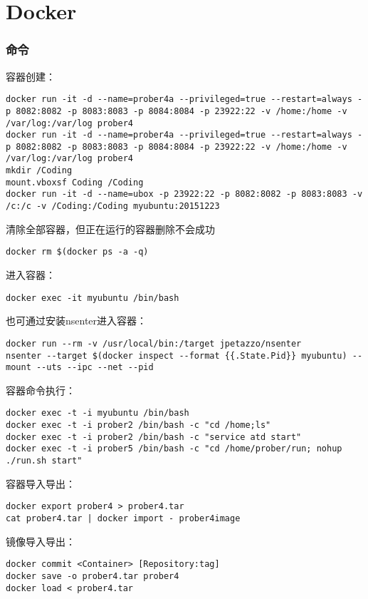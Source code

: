 \section{Docker}

\subsubsection{命令}


容器创建：
\begin{verbatim}
docker run -it -d --name=prober4a --privileged=true --restart=always -p 8082:8082 -p 8083:8083 -p 8084:8084 -p 23922:22 -v /home:/home -v /var/log:/var/log prober4 
docker run -it -d --name=prober4a --privileged=true --restart=always -p 8082:8082 -p 8083:8083 -p 8084:8084 -p 23922:22 -v /home:/home -v /var/log:/var/log prober4 
mkdir /Coding
mount.vboxsf Coding /Coding
docker run -it -d --name=ubox -p 23922:22 -p 8082:8082 -p 8083:8083 -v /c:/c -v /Coding:/Coding myubuntu:20151223
\end{verbatim}

清除全部容器，但正在运行的容器删除不会成功
\begin{verbatim}
docker rm $(docker ps -a -q) 
\end{verbatim}



进入容器：
\begin{verbatim}
docker exec -it myubuntu /bin/bash
\end{verbatim}

也可通过安装nsenter进入容器：
\begin{verbatim}
docker run --rm -v /usr/local/bin:/target jpetazzo/nsenter
nsenter --target $(docker inspect --format {{.State.Pid}} myubuntu) --mount --uts --ipc --net --pid
\end{verbatim}

容器命令执行：
\begin{verbatim}
docker exec -t -i myubuntu /bin/bash
docker exec -t -i prober2 /bin/bash -c "cd /home;ls"
docker exec -t -i prober2 /bin/bash -c "service atd start"
docker exec -t -i prober5 /bin/bash -c "cd /home/prober/run; nohup ./run.sh start" 
\end{verbatim}

容器导入导出：
\begin{verbatim}
docker export prober4 > prober4.tar
cat prober4.tar | docker import - prober4image
\end{verbatim}

镜像导入导出：
\begin{verbatim}
docker commit <Container> [Repository:tag]
docker save -o prober4.tar prober4
docker load < prober4.tar
\end{verbatim}

